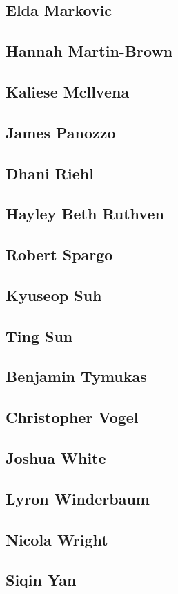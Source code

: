 \documentclass[twoside,14pt,a4paper,notitlepage]{memoir}
\begin{document}
\subsection*{Elda Markovic}


\subsection*{Hannah Martin-Brown}


\subsection*{Kaliese Mcllvena}


\subsection*{James Panozzo}


\subsection*{Dhani Riehl}


\subsection*{Hayley Beth Ruthven}


\subsection*{Robert Spargo}


\subsection*{Kyuseop Suh}


\subsection*{Ting Sun}


\subsection*{Benjamin Tymukas}


\subsection*{Christopher Vogel}


\subsection*{Joshua White}


\subsection*{Lyron Winderbaum}


\subsection*{Nicola Wright}


\subsection*{Siqin Yan}
\end{document}
